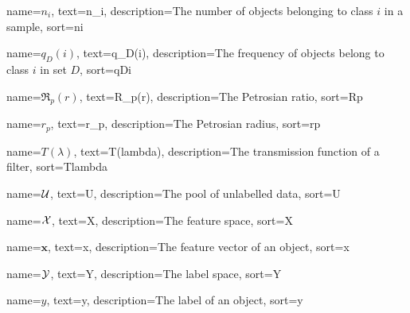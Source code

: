 %
{%
	name={$n_i$},
	text={n_i},
	description={The number of objects belonging to class $i$ in a sample},
	sort={ni}
}

%
{%
	name={$q_D(i)$},
	text={q_D(i)},
	description={The frequency of objects belong to class $i$ in set $D$},
	sort={qDi}
}

%
{%
	name={$\mathfrak{R}_p(r)$},
	text={R_p(r)},
	description={The Petrosian ratio},
	sort={Rp}
}

%
{%
	name={$r_p$},
	text={r_p},
	description={The Petrosian radius},
	sort={rp}
}


%
{%
	name={$T(\lambda)$},
	text={T(lambda)},
	description={The transmission function of a filter},
	sort={Tlambda}
}

%
{%
	name={$\mathcal{U}$},
	text={U},
	description={The pool of unlabelled data},
	sort={U}
}

%
{%
	name={$\mathcal{X}$},
	text={X},
	description={The feature space},
	sort={X}
}

%
{%
	name={$\bm{x}$},
	text={x},
	description={The feature vector of an object},
	sort={x}
}

%
{%
	name={$\mathcal{Y}$},
	text={Y},
	description={The label space},
	sort={Y}
}

%
{%
	name={$y$},
	text={y},
	description={The label of an object},
	sort={y}
}



